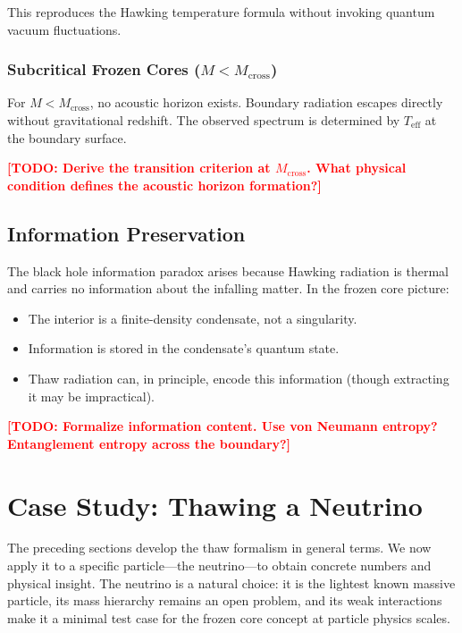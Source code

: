 \documentclass[11pt,a4paper]{article}
\newcommand{\Teff}{\ensuremath{T_{\mathrm{eff}}}}
\newcommand{\Mcross}{\ensuremath{M_{\mathrm{cross}}}}
\newcommand{\TODO}[1]{\textcolor{red}{\textbf{[TODO: #1]}}}
\theoremstyle{definition}
\theoremstyle{remark}
\begin{document}
This reproduces the Hawking temperature formula without invoking quantum vacuum fluctuations.

\subsubsection{Subcritical Frozen Cores ($M < \Mcross$)}
For $M < \Mcross$, no acoustic horizon exists. Boundary radiation escapes directly without gravitational redshift. The observed spectrum is determined by $\Teff$ at the boundary surface.

\TODO{Derive the transition criterion at $\Mcross$. What physical condition defines the acoustic horizon formation?}

\subsection{Information Preservation}
\label{sec:information}

The black hole information paradox arises because Hawking radiation is thermal and carries no information about the infalling matter. In the frozen core picture:
\begin{itemize}[leftmargin=*, itemsep=0.3em]
\item The interior is a finite-density condensate, not a singularity.
\item Information is stored in the condensate's quantum state.
\item Thaw radiation can, in principle, encode this information (though extracting it may be impractical).
\end{itemize}

\TODO{Formalize information content. Use von Neumann entropy? Entanglement entropy across the boundary?}

\section{Case Study: Thawing a Neutrino}
\label{sec:neutrino_thaw}

The preceding sections develop the thaw formalism in general terms. We now apply it to a specific particle---the neutrino---to obtain concrete numbers and physical insight. The neutrino is a natural choice: it is the lightest known massive particle, its mass hierarchy remains an open problem, and its weak interactions make it a minimal test case for the frozen core concept at particle physics scales.
\end{document}
